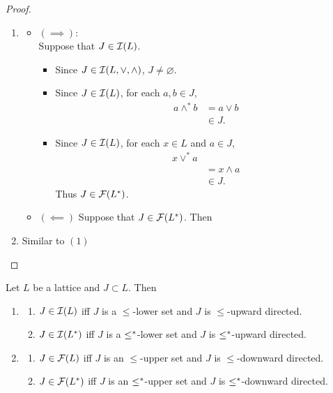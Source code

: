 \documentclass{book}
\begin{document}
	\begin{proof}\
		\begin{enumerate}
			\item 
			\begin{itemize}
				\item $(\implies)$: \\
				Suppose that $J \in \mathcal{I}(L)$.
				\begin{itemize}
					\item Since $J \in \mathcal{I}(L, \vee, \wedge)$, $J \neq \varnothing$.
					\item Since $J \in \mathcal{I}(L)$, for each $a,b \in J$,
					\begin{align*}
						a \wedge^* b
						& = a \vee b \\
						& \in J.
					\end{align*}
					\item Since $J \in \mathcal{I}(L)$, for each $x \in L$ and $a \in J$, 
					\begin{align*}
						x \vee^* a \\
						& = x \wedge a \\
						& \in J.
					\end{align*}
					Thus $J \in \mathcal{F}(L^*)$.
				\end{itemize}
				\item $(\impliedby)$
				Suppose that $J \in \mathcal{F}(L^*)$. Then 
			\end{itemize}
			\item Similar to $(1)$ 
		\end{enumerate}
	\end{proof}
	
	\begin{ex}
		Let $L$ be a lattice and $J \subset L$. Then
		\begin{enumerate}
			\item 
			\begin{enumerate}
				\item $J \in \mathcal{I}(L)$ iff $J$ is a $\leq$-lower set and $J$ is $\leq$-upward directed.  
				\item $J \in \mathcal{I}(L^*)$ iff $J$ is a $\leq^*$-lower set and $J$ is $\leq^*$-upward directed.  
			\end{enumerate}
			\item 
			\begin{enumerate}
				\item $J \in \mathcal{F}(L)$ iff $J$ is an $\leq$-upper set and $J$ is $\leq$-downward directed.
				\item $J \in \mathcal{F}(L^*)$ iff $J$ is an $\leq^*$-upper set and $J$ is $\leq^*$-downward directed.
			\end{enumerate}
		\end{enumerate}
		 \\
		 \\
	\end{ex}
	
\end{document}
